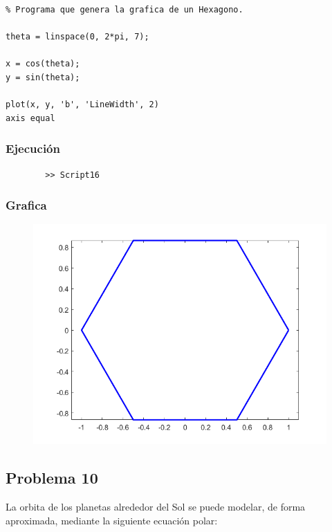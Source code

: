 \documentclass{article}
\begin{document}
	\begin{lstlisting}
% Programa que genera la grafica de un Hexagono.

theta = linspace(0, 2*pi, 7);

x = cos(theta);
y = sin(theta);

plot(x, y, 'b', 'LineWidth', 2)
axis equal
	\end{lstlisting}
	
	\subsubsection{Ejecución}
	
	\begin{lstlisting}
		>> Script16
	\end{lstlisting}
	
	\subsubsection{Grafica}
	
	\begin{figure}[h]
		\centering
		\includegraphics[width=\textwidth]{grafica16.png}
	\end{figure}
	
	\newpage
	
	\subsection{Problema 10}
	
	La orbita de los planetas alrededor del Sol se puede modelar, de forma aproximada, mediante la siguiente ecuación polar:
	
\end{document}
